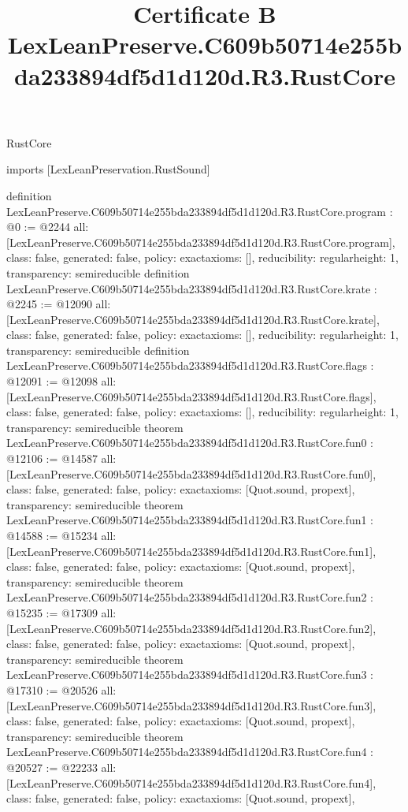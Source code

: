 \begin{lexlean}{RustCore}
\title{Certificate B LexLeanPreserve.C609b50714e255bda233894df5d1d120d.R3.RustCore}
\begin{coremodule}
imports [LexLeanPreservation.RustSound]

definition LexLeanPreserve.C609b50714e255bda233894df5d1d120d.R3.RustCore.program : @0 := @2244 {
  all: [LexLeanPreserve.C609b50714e255bda233894df5d1d120d.R3.RustCore.program],
  class: false,
  generated: false,
  policy: exact{axioms: []},
  reducibility: regular{height: 1},
  transparency: semireducible
}
definition LexLeanPreserve.C609b50714e255bda233894df5d1d120d.R3.RustCore.krate : @2245 := @12090 {
  all: [LexLeanPreserve.C609b50714e255bda233894df5d1d120d.R3.RustCore.krate],
  class: false,
  generated: false,
  policy: exact{axioms: []},
  reducibility: regular{height: 1},
  transparency: semireducible
}
definition LexLeanPreserve.C609b50714e255bda233894df5d1d120d.R3.RustCore.flags : @12091 := @12098 {
  all: [LexLeanPreserve.C609b50714e255bda233894df5d1d120d.R3.RustCore.flags],
  class: false,
  generated: false,
  policy: exact{axioms: []},
  reducibility: regular{height: 1},
  transparency: semireducible
}
theorem LexLeanPreserve.C609b50714e255bda233894df5d1d120d.R3.RustCore.fun0 : @12106 := @14587 {
  all: [LexLeanPreserve.C609b50714e255bda233894df5d1d120d.R3.RustCore.fun0],
  class: false,
  generated: false,
  policy: exact{axioms: [Quot.sound, propext]},
  transparency: semireducible
}
theorem LexLeanPreserve.C609b50714e255bda233894df5d1d120d.R3.RustCore.fun1 : @14588 := @15234 {
  all: [LexLeanPreserve.C609b50714e255bda233894df5d1d120d.R3.RustCore.fun1],
  class: false,
  generated: false,
  policy: exact{axioms: [Quot.sound, propext]},
  transparency: semireducible
}
theorem LexLeanPreserve.C609b50714e255bda233894df5d1d120d.R3.RustCore.fun2 : @15235 := @17309 {
  all: [LexLeanPreserve.C609b50714e255bda233894df5d1d120d.R3.RustCore.fun2],
  class: false,
  generated: false,
  policy: exact{axioms: [Quot.sound, propext]},
  transparency: semireducible
}
theorem LexLeanPreserve.C609b50714e255bda233894df5d1d120d.R3.RustCore.fun3 : @17310 := @20526 {
  all: [LexLeanPreserve.C609b50714e255bda233894df5d1d120d.R3.RustCore.fun3],
  class: false,
  generated: false,
  policy: exact{axioms: [Quot.sound, propext]},
  transparency: semireducible
}
theorem LexLeanPreserve.C609b50714e255bda233894df5d1d120d.R3.RustCore.fun4 : @20527 := @22233 {
  all: [LexLeanPreserve.C609b50714e255bda233894df5d1d120d.R3.RustCore.fun4],
  class: false,
  generated: false,
  policy: exact{axioms: [Quot.sound, propext]},
}
\end{coremodule}
\end{lexlean}
